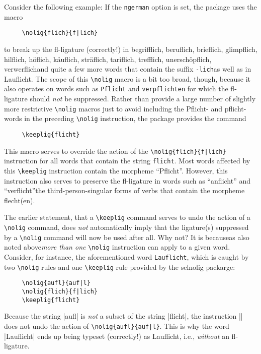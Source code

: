 \documentclass[11pt]{article}
\newcommand{\pkg}[1]{\textsf{#1}}
\newcommand{\opt}[1]{\texttt{#1}}
\newcommand{\cmmd}[1]{\texttt{\textbackslash #1}}
\begin{document}
Consider the following example: If the \opt{ngerman} option is set, the package uses the macro 
\begin{Verbatim}
     \nolig{flich}{f|lich}
\end{Verbatim}
to break up the fl-ligature (correctly!) in begrifflich, beruflich, brieflich, glimpflich, hilflich, höflich, käuflich, sträflich, tariflich, trefflich, unerschöpflich, verwerflich\textemdash and quite a few more words that contain the suffix \opt{-lich}\textemdash as well as in Lauflicht. The scope of this \cmmd{nolig} macro is a bit too broad, though, because it also operates on words such as \opt{Pflicht} and \opt{verpflichten} for which the fl-ligature should \emph{not} be suppressed. Rather than provide a large number of slightly more restrictive \cmmd{nolig} macros just to avoid including the Pflicht- and pflicht-words in the preceding \cmmd{nolig} instruction, the package provides the command
\begin{Verbatim}
     \keeplig{flicht}
\end{Verbatim}
This macro serves to override the action of the \Verb+\nolig{flich}{f|lich}+ instruction for all words that contain the string \opt{flicht}. Most words affected by this \cmmd{keeplig} instruction contain the morpheme \enquote{Pflicht}. However, this instruction also serves to preserve the fl-ligature in words such as \enquote{anflicht} and \enquote{verflicht}\textemdash the third-person-singular forms of verbs that contain the morpheme flecht(en). 

The earlier statement, that a \cmmd{keeplig} command serves to undo the action of a \cmmd{nolig} command, does \emph{not} automatically imply that the ligature(s) suppressed by a \cmmd{nolig} command will now be used after all. Why not? It is because\textemdash as also noted above\textemdash \emph{more than one} \cmmd{nolig} instruction can apply to a given word. Consider, for instance, the aforementioned word \opt{Lauflicht}, which is caught by two \cmmd{nolig} rules and one \cmmd{keeplig} rule provided by the \pkg{selnolig} packarge: 
\begin{Verbatim}
     \nolig{aufl}{auf|l}
     \nolig{flich}{f|lich}
     \keeplig{flicht}
\end{Verbatim}
Because the string |aufl| is \emph{not} a subset of the string |flicht|, the instruction || does not undo the action of \Verb+\nolig{aufl}{auf|l}+. This is why the word |Lauflicht| ends up being typeset (correctly!) as Lauflicht, i.e., \emph{without} an fl-ligature. 
\end{document}
